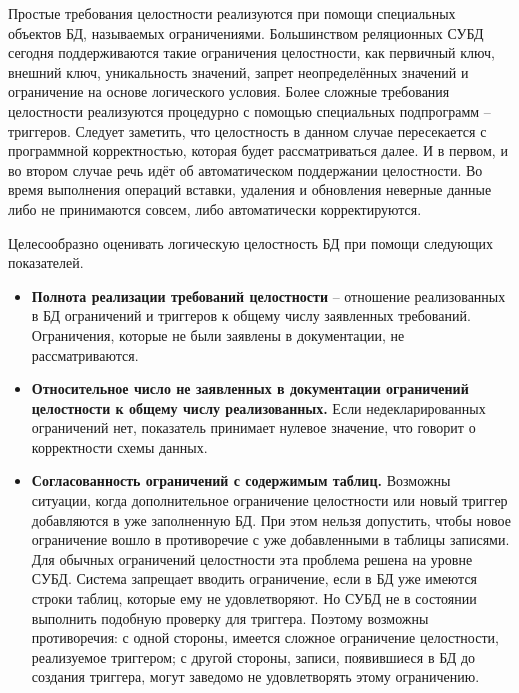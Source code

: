 \begin{enumerate}
        Простые требования целостности реализуются при помощи специальных объектов БД, называемых ограничениями.
        Большинством реляционных СУБД сегодня поддерживаются такие ограничения целостности, как первичный ключ,
        внешний ключ, уникальность значений, запрет неопределённых значений и ограничение на основе логического
        условия. Более сложные требования целостности реализуются процедурно с помощью специальных подпрограмм
        – триггеров. Следует заметить, что целостность в данном случае пересекается с программной корректностью,
        которая будет рассматриваться далее. И в первом, и во втором случае речь идёт об автоматическом
        поддержании целостности. Во время выполнения операций вставки, удаления и обновления неверные данные либо
        не принимаются совсем, либо автоматически корректируются.

        Целесообразно оценивать логическую целостность БД при помощи следующих показателей.
        \begin{itemize}
            \item \textbf{Полнота реализации требований целостности} – отношение реализованных в БД ограничений
            и триггеров к общему числу заявленных требований. Ограничения, которые не были заявлены в документации,
            не рассматриваются.

            \item \textbf{Относительное число не заявленных в документации ограничений целостности к общему числу реализованных.}
            Если недекларированных ограничений нет, показатель принимает нулевое значение, что говорит о
            корректности схемы данных.

            \item \textbf{Согласованность ограничений с содержимым таблиц.} Возможны ситуации, когда дополнительное
            ограничение целостности или новый триггер добавляются в уже заполненную БД. При этом нельзя допустить,
            чтобы новое ограничение вошло в противоречие с уже добавленными в таблицы записями. Для обычных
            ограничений целостности эта проблема решена на уровне СУБД. Система запрещает вводить ограничение,
            если в БД уже имеются строки таблиц, которые ему не удовлетворяют. Но СУБД не в состоянии выполнить
            подобную проверку для триггера. Поэтому возможны противоречия: с одной стороны, имеется сложное
            ограничение целостности, реализуемое триггером; с другой стороны, записи, появившиеся в БД до создания
            триггера, могут заведомо не удовлетворять этому ограничению.


\end{itemize}
\end{enumerate}
